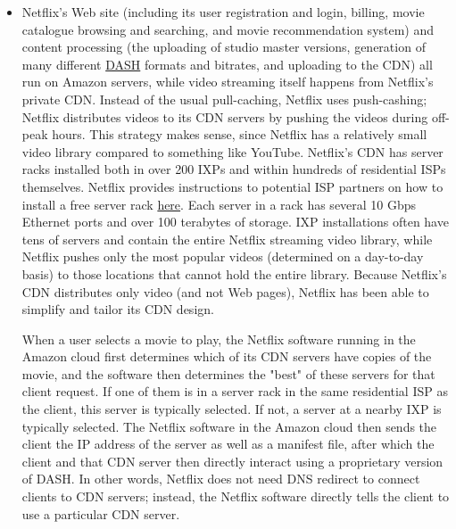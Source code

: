 \documentclass[8pt, table, xcdraw]{article}%
\begin{document}
\begin{itemize}
    \item Netflix's Web site (including its user registration and login, billing, movie catalogue browsing and searching, and movie recommendation system) and content processing (the uploading of studio master versions, generation of many different \hyperref[DASH]{DASH} formats and bitrates, and uploading to the CDN) all run on Amazon servers, while video streaming itself happens from Netflix's private CDN. Instead of the usual pull-caching, Netflix uses push-cashing; Netflix distributes videos to its CDN servers by pushing the videos during off-peak hours. This strategy makes sense, since Netflix has a relatively small video library compared to something like YouTube. Netflix's CDN has server racks installed both in over 200 IXPs and within hundreds of residential ISPs themselves. Netflix provides instructions to potential ISP partners on how to install a free server rack \href{https://openconnect.netflix.com/en/}{here}. Each server in a rack has several 10 Gbps Ethernet ports and over 100 terabytes of storage. IXP installations often have tens of servers and contain the entire Netflix streaming video library, while Netflix pushes only the most popular videos (determined on a day-to-day basis) to those locations that cannot hold the entire library. Because Netflix's CDN distributes only video (and not Web pages), Netflix has been able to simplify and tailor its CDN design.
    
    When a user selects a movie to play, the Netflix software running in the Amazon cloud first determines which of its CDN servers have copies of the movie, and the software then determines the "best" of these servers for that client request. If one of them is in a server rack in the same residential ISP as the client, this server is typically selected. If not, a server at a nearby IXP is typically selected. The Netflix software in the Amazon cloud then sends the client the IP address of the server as well as a manifest file, after which the client and that CDN server then directly interact using a proprietary version of DASH. In other words, Netflix does not need DNS redirect to connect clients to CDN servers; instead, the Netflix software directly tells the client to use a particular CDN server.
\end{itemize}
\end{document}
